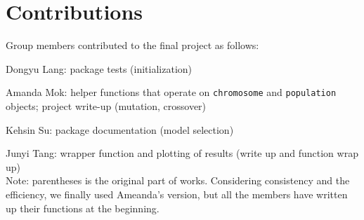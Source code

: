 \documentclass{article}\usepackage[]{graphicx}\usepackage[]{color}
\begin{document}
\section{Contributions}

Group members contributed to the final project as follows:

Dongyu Lang: package tests (initialization)

Amanda Mok: helper functions that operate on \texttt{chromosome} and \texttt{population} objects; project write-up (mutation, crossover)

Kehsin Su: package documentation (model selection)

Junyi Tang: wrapper function and plotting of results (write up and function wrap up)\\

Note: parentheses is the original part of works. Considering consistency and the efficiency, we finally used Ameanda's version, but all the members have written up their functions at the beginning.
\end{document}
